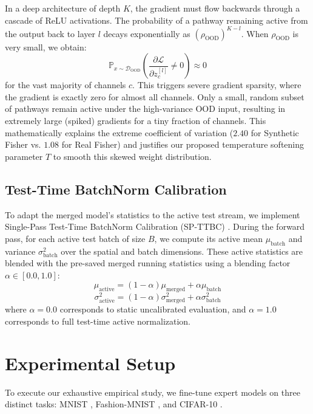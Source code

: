 \documentclass{article}
\theoremstyle{plain}
\theoremstyle{definition}
\theoremstyle{remark}
\begin{document}
In a deep architecture of depth $K$, the gradient must flow backwards through a cascade of ReLU activations. The probability of a pathway remaining active from the output back to layer $l$ decays exponentially as $(\rho_{\text{OOD}})^{K-l}$. When $\rho_{\text{OOD}}$ is very small, we obtain:
\begin{equation}
    \mathbb{P}_{x \sim \mathcal{D}_{\text{OOD}}}\left(\frac{\partial \mathcal{L}}{\partial z^{[l]}_c} \neq 0\right) \approx 0
\end{equation}
for the vast majority of channels $c$. This triggers severe gradient sparsity, where the gradient is exactly zero for almost all channels. Only a small, random subset of pathways remain active under the high-variance OOD input, resulting in extremely large (spiked) gradients for a tiny fraction of channels. This mathematically explains the extreme coefficient of variation ($2.40$ for Synthetic Fisher vs. $1.08$ for Real Fisher) and justifies our proposed temperature softening parameter $T$ to smooth this skewed weight distribution.

\subsection{Test-Time BatchNorm Calibration}
To adapt the merged model's statistics to the active test stream, we implement Single-Pass Test-Time BatchNorm Calibration (SP-TTBC) \cite{s5_spttbc}. During the forward pass, for each active test batch of size $B$, we compute its active mean $\mu_{\text{batch}}$ and variance $\sigma^2_{\text{batch}}$ over the spatial and batch dimensions. These active statistics are blended with the pre-saved merged running statistics using a blending factor $\alpha \in [0.0, 1.0]$:
\begin{equation}
    \mu_{\text{active}} = (1 - \alpha) \mu_{\text{merged}} + \alpha \mu_{\text{batch}}
\end{equation}
\begin{equation}
    \sigma^2_{\text{active}} = (1 - \alpha) \sigma^2_{\text{merged}} + \alpha \sigma^2_{\text{batch}}
\end{equation}
where $\alpha=0.0$ corresponds to static uncalibrated evaluation, and $\alpha=1.0$ corresponds to full test-time active normalization.

\section{Experimental Setup}
\label{sec:setup}
To execute our exhaustive empirical study, we fine-tune expert models on three distinct tasks: MNIST \cite{lecun98mnist}, Fashion-MNIST \cite{fashionmnist}, and CIFAR-10 \cite{cifar10}.
\end{document}
